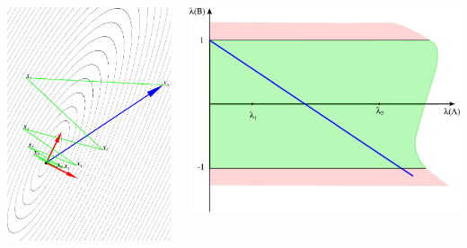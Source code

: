 \documentclass[professionalfonts,compress,unicode]{beamer}
\begin{document}
{
\begin{columns}
\begin{column}{0.5\textwidth}
\includegraphics[width=\columnwidth]{si0_45.pdf}%
\end{column}
\begin{column}{0.5\textwidth}
\includegraphics[width=\columnwidth]{lAlB0_45.pdf}%
\end{column}
\end{columns}
}
\end{document}
